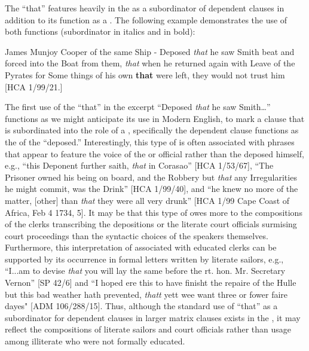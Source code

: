 The  “that” features heavily in the  as a subordinator of dependent clauses in addition to its function as a . The following example demonstrates the use of both functions (subordinator in italics and  in bold):

James Munjoy Cooper of the same Ship - Deposed \textit{that} he saw Smith beat and forced into the Boat from them, \textit{that} when he returned again with Leave of the Pyrates for Some things of his own \textbf{that} were left, they would not trust him [HCA 1/99/21.]

The first use of the  “that” in the excerpt “Deposed \textit{that} he saw Smith…” functions as we might anticipate its use in Modern English, to mark a clause that is subordinated into the role of a , specifically the dependent clause functions as the  of the  “deposed.” Interestingly, this type of  is often associated with phrases that appear to feature the voice of the  or official rather than the deposed  himself, e.g., “this Deponent further saith, \textit{that} in Corasao” [HCA 1/53/67], “The Prisoner owned his being on board, and the Robbery but \textit{that} any Irregularities he might commit, was the Drink” [HCA 1/99/40], and “he knew no more of the matter, [other] than \textit{that} they were all very drunk” [HCA 1/99 Cape Coast of Africa, Feb 4 1734, 5]. It may be that this type of  owes more to the compositions of the clerks transcribing the depositions or the literate court officials surmising court proceedings than the syntactic choices of the speakers themselves. Furthermore, this interpretation of  associated with educated clerks can be supported by its occurrence in formal letters written by literate sailors, e.g., “I...am to devise \textit{that} you will lay the same before the rt. hon. Mr. Secretary Vernon” [SP 42/6] and “I hoped ere this to have finisht the repaire of the Hulle but this bad weather hath prevented, \textit{thatt} yett wee want three or fower faire dayes" [ADM 106/288/15]. Thus, although the standard use of “that” as a subordinator for dependent clauses in larger matrix clauses exists in the , it may reflect the compositions of literate sailors and court officials rather than usage among illiterate  who were not formally educated. 

